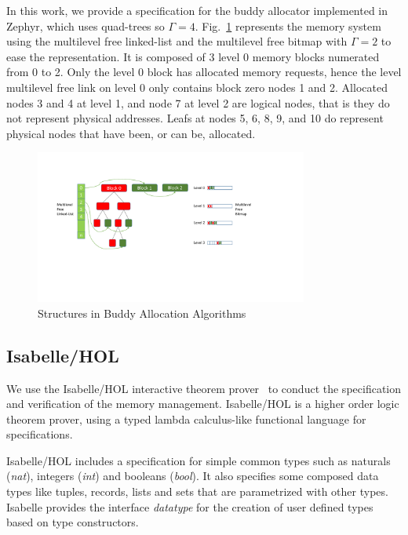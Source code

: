 In this work, we provide a specification for the buddy allocator implemented in Zephyr, which uses quad-trees so $\Gamma = 4$.  Fig.~\ref{fig3} represents the memory system using the multilevel free linked-list and the multilevel free bitmap with $\Gamma = 2$ to ease the representation. It is composed of 3 level 0 memory blocks numerated from 0 to 2. Only the level 0 block has allocated memory requests, hence the level multilevel free link on level 0 only contains block zero nodes 1 and 2. Allocated nodes 3 and 4 at level 1, and node 7 at level 2 are logical nodes, that is they do not represent physical addresses. Leafs at nodes 5, 6, 8, 9, and 10 do represent physical nodes that have been, or can be, allocated.
\begin{figure}[htbp]
	\centering
	\includegraphics[width=0.8\textwidth]{fig3.pdf}
	\caption{Structures in Buddy Allocation Algorithms}
	\label{fig3}
\end{figure}

\subsection{Isabelle/HOL}
We use the Isabelle/HOL interactive theorem prover~\cite{reg_Isabelle/HOL} to conduct the specification and verification of the memory management. Isabelle/HOL is a higher order logic theorem prover, using a typed lambda calculus-like functional language for specifications.

Isabelle/HOL includes a specification for simple common types such as naturals (\emph{nat}), integers (\emph{int}) and booleans (\emph{bool}). It also specifies some composed data types like tuples, records, lists and sets that are parametrized with other types. Isabelle provides the interface \emph{datatype} for the creation of user defined types based on type constructors.

